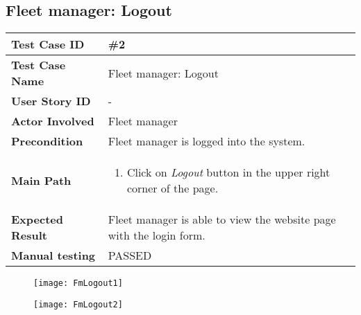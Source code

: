 \subsection{Fleet manager: Logout}
\begin{center}
	\begin{tabular} { | m{3.5cm} | m{9.5cm} | }
		\hline
		\textbf{Test Case ID} & \#2\\
		\hline
		\textbf{Test Case Name} & Fleet manager: Logout\\
		\hline
		\textbf{User Story ID} & - \\
		\hline
		\textbf{Actor Involved} & Fleet manager\\
		\hline
		\textbf{Precondition} & Fleet manager is logged into the system.\\
		\hline
		\textbf{Main Path} & 
		\begin{enumerate}
			\item Click on \textit{Logout} button in the upper right corner of the page.
		\end{enumerate}\\
		\hline
		\textbf{Expected Result} & Fleet manager is able to view the website page with the login form.\\
		\hline
		\textbf{Manual testing} & PASSED\\
		\hline
	\end{tabular}
\end{center}
\begin{figure}[H]
	\centering
	\texttt{[image: FmLogout1]}
\end{figure}
\begin{figure}[H]
	\centering
	\texttt{[image: FmLogout2]}
\end{figure}
\newpage
